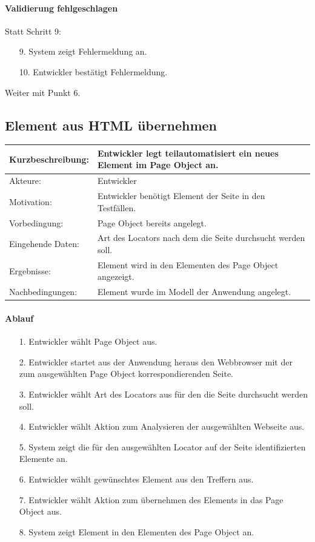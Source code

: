 \paragraph{Validierung fehlgeschlagen}
Statt Schritt 9:
\begin{itemize}
\item[9.] System zeigt Fehlermeldung an. 
\item[10.] Entwickler bestätigt Fehlermeldung. 
\end{itemize}
Weiter mit Punkt 6. 


\subsection{Element aus HTML übernehmen}
\label{sec:element_from_html}

\begin{tabular}[h]{|p{4cm}|p{}|}
\hline 
\rule[-1ex]{0pt}{2.5ex}Kurzbeschreibung: & 
Entwickler legt teilautomatisiert ein neues Element im Page Object an. \\  
\hline 
\rule[-1ex]{0pt}{2.5ex}Akteure: & 
Entwickler \\ 
\hline 
\rule[-1ex]{0pt}{2.5ex}Motivation: & 
Entwickler benötigt Element der Seite in den Testfällen. \\ 
\hline 
\rule[-1ex]{0pt}{2.5ex}Vorbedingung: & 
Page Object bereits angelegt. \\ 
\hline 
\rule[-1ex]{0pt}{2.5ex}Eingehende Daten: & Art des Locators nach dem die Seite durchsucht werden soll. \\ 
\hline 
\rule[-1ex]{0pt}{2.5ex}Ergebnisse: & Element wird in den Elementen des Page Object angezeigt. \\ 
\hline 
\rule[-1ex]{0pt}{2.5ex}Nachbedingungen: & Element wurde im Modell der Anwendung angelegt.  \\ 
\hline 
\end{tabular} 

\paragraph{Ablauf}

\begin{itemize}[itemsep=0pt]
\item[1.] Entwickler wählt Page Object aus.
\item[2.] Entwickler startet aus der Anwendung heraus den Webbrowser mit der zum ausgewählten Page Object korrespondierenden Seite. 
\item[3.] Entwickler wählt Art des Locators aus für den die Seite durchsucht werden soll.
\item[4.] Entwickler wählt Aktion zum Analysieren der ausgewählten Webseite aus.
\item[5.] System zeigt die für den ausgewählten Locator auf der Seite identifizierten Elemente an.
\item[6.] Entwickler wählt gewünschtes Element aus den Treffern aus. 
\item[7.] Entwickler wählt Aktion zum übernehmen des Elements in das Page Object aus.
\item[8.] System zeigt Element in den Elementen des Page Object an.
\end{itemize}

